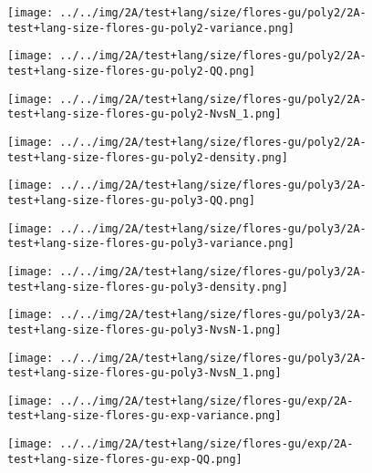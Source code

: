 \begin{figure}[H]
\centering	\texttt{[image: ../../img/2A/test+lang/size/flores-gu/poly2/2A-test+lang-size-flores-gu-poly2-variance.png]}
\end{figure}
\begin{figure}[H]
\centering	\texttt{[image: ../../img/2A/test+lang/size/flores-gu/poly2/2A-test+lang-size-flores-gu-poly2-QQ.png]}
\end{figure}
\begin{figure}[H]
\centering	\texttt{[image: ../../img/2A/test+lang/size/flores-gu/poly2/2A-test+lang-size-flores-gu-poly2-NvsN\_1.png]}
\end{figure}
\begin{figure}[H]
\centering	\texttt{[image: ../../img/2A/test+lang/size/flores-gu/poly2/2A-test+lang-size-flores-gu-poly2-density.png]}
\end{figure}
\begin{figure}[H]
\centering	\texttt{[image: ../../img/2A/test+lang/size/flores-gu/poly3/2A-test+lang-size-flores-gu-poly3-QQ.png]}
\end{figure}
\begin{figure}[H]
\centering	\texttt{[image: ../../img/2A/test+lang/size/flores-gu/poly3/2A-test+lang-size-flores-gu-poly3-variance.png]}
\end{figure}
\begin{figure}[H]
\centering	\texttt{[image: ../../img/2A/test+lang/size/flores-gu/poly3/2A-test+lang-size-flores-gu-poly3-density.png]}
\end{figure}
\begin{figure}[H]
\centering	\texttt{[image: ../../img/2A/test+lang/size/flores-gu/poly3/2A-test+lang-size-flores-gu-poly3-NvsN-1.png]}
\end{figure}
\begin{figure}[H]
\centering	\texttt{[image: ../../img/2A/test+lang/size/flores-gu/poly3/2A-test+lang-size-flores-gu-poly3-NvsN\_1.png]}
\end{figure}
\begin{figure}[H]
\centering	\texttt{[image: ../../img/2A/test+lang/size/flores-gu/exp/2A-test+lang-size-flores-gu-exp-variance.png]}
\end{figure}
\begin{figure}[H]
\centering	\texttt{[image: ../../img/2A/test+lang/size/flores-gu/exp/2A-test+lang-size-flores-gu-exp-QQ.png]}
\end{figure}
